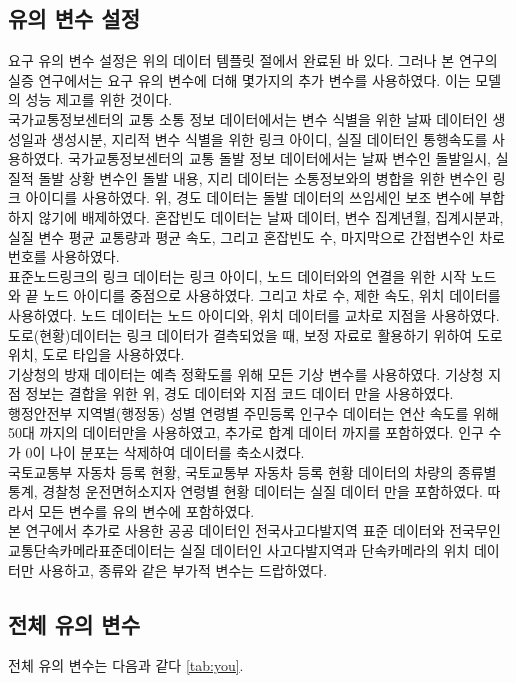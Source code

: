 \documentclass[11pt]{report}
\begin{document}
\subsection{유의 변수 설정}
요구 유의 변수 설정은 위의 데이터 템플릿 절에서 완료된 바 있다. 
그러나 본 연구의 실증 연구에서는 요구 유의 변수에 더해 몇가지의 추가 변수를 사용하였다. 
이는 모델의 성능 제고를 위한 것이다. \\
\indent 국가교통정보센터의 교통 소통 정보 데이터에서는 변수 식별을 위한 날짜 데이터인 생성일과 생성시분, 지리적 변수 식별을 위한 링크 아이디, 
실질 데이터인 통행속도를 사용하였다. 
국가교통정보센터의 교통 돌발 정보 데이터에서는 날짜 변수인 돌발일시, 실질적 돌발 상황 변수인 돌발 내용, 지리 데이터는 소통정보와의 병합을 위한 변수인 링크 아이디를 사용하였다. 
위, 경도 데이터는 돌발 데이터의 쓰임세인 보조 변수에 부합하지 않기에 배제하였다. 
혼잡빈도 데이터는 날짜 데이터, 변수 집계년월, 집계시분과, 실질 변수 평균 교통량과 평균 속도, 그리고 혼잡빈도 수, 마지막으로 간접변수인 차로 번호를 사용하였다. \\
\indent 표준노드링크의 링크 데이터는 링크 아이디, 노드 데이터와의 연결을 위한 시작 노드 와 끝 노드 아이디를 중점으로 사용하였다. 
그리고 차로 수, 제한 속도, 위치 데이터를 사용하였다. 
노드 데이터는 노드 아이디와, 위치 데이터를 교차로 지점을 사용하였다. 
도로(현황)데이터는 링크 데이터가 결측되었을 때, 보정 자료로 활용하기 위하여 도로 위치, 도로 타입을 사용하였다. \\
\indent 기상청의 방재 데이터는 예측 정확도를 위해 모든 기상 변수를 사용하였다. 
기상청 지점 정보는 결합을 위한 위, 경도 데이터와 지점 코드 데이터 만을 사용하였다. \\
\indent 행정안전부 지역별(행정동) 성별 연령별 주민등록 인구수 데이터는 연산 속도를 위해 50대 까지의 데이터만을 사용하였고, 추가로 합계 데이터 까지를 포함하였다. 
인구 수가 0이 나이 분포는 삭제하여 데이터를 축소시켰다. \\
\indent 국토교통부 자동차 등록 현황, 
국토교통부 자동차 등록 현황 데이터의 차량의 종류별 통계,
경찰청 운전면허소지자 연령별 현황 데이터는 실질 데이터 만을 포함하였다. 
따라서 모든 변수를 유의 변수에  포함하였다. \\
\indent 본 연구에서 추가로 사용한 공공 데이터인 전국사고다발지역 표준 데이터와 전국무인교통단속카메라표준데이터는 실질 데이터인 사고다발지역과 단속카메라의 위치 데이터만 사용하고, 종류와 같은 부가적 변수는 드랍하였다. 

\subsection*{전체 유의 변수}
전체 유의 변수는 다음과 같다 \autoref{tab:you}.
\end{document}
